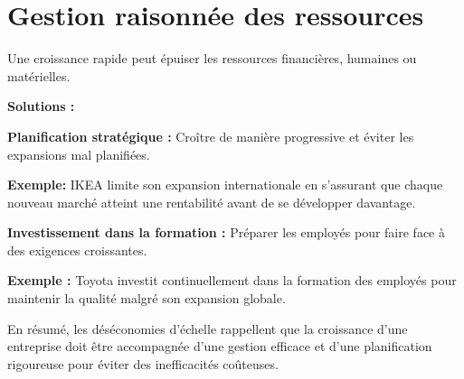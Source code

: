 \section{Gestion raisonnée des ressources}
Une croissance rapide peut épuiser les ressources financières, humaines ou matérielles.
\par
\textbf{Solutions :}
\par
\textbf{Planification stratégique :} Croître de manière progressive et éviter les expansions mal planifiées.
\par
\textbf{Exemple:} IKEA limite son expansion internationale en s’assurant que chaque nouveau marché
atteint une rentabilité avant de se développer davantage.
\par
\textbf{Investissement dans la formation :} Préparer les employés pour faire face à des
exigences croissantes.
\par
\textbf{Exemple :} Toyota investit continuellement dans la formation des employés pour
maintenir la qualité malgré son expansion globale.
\par
En résumé, les déséconomies d’échelle rappellent que la croissance d’une
entreprise doit être accompagnée d’une gestion efficace et d’une planification
rigoureuse pour éviter des inefficacités coûteuses.

